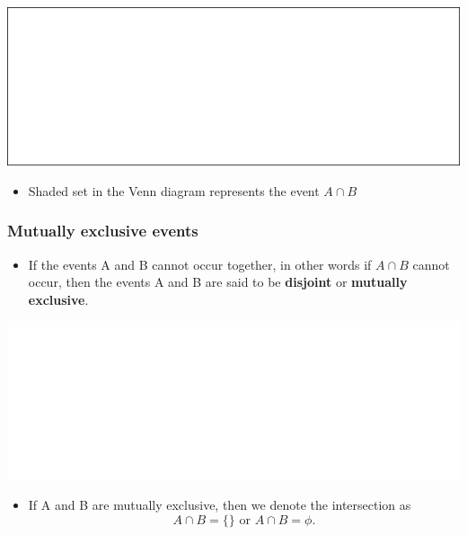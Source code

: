 \documentclass[]{book}
\providecommand{\tightlist}{%
  \setlength{\itemsep}{0pt}\setlength{\parskip}{0pt}}
\begin{document}
\begin{center}\includegraphics[width=1\linewidth]{figure/box72-1} \end{center}

\begin{itemize}
\tightlist
\item
  Shaded set in the Venn diagram represents the event \(A \cap B\)
\end{itemize}

\hypertarget{mutually-exclusive-events}{%
\subsubsection{Mutually exclusive events}\label{mutually-exclusive-events}}

\begin{itemize}
\tightlist
\item
  If the events A and B cannot occur together, in other words if \(A \cap B\) cannot occur, then the events A and B are said to be \textbf{disjoint} or \textbf{mutually exclusive}.
\end{itemize}

\begin{center}\includegraphics[width=1\linewidth]{figure/box73-1} \end{center}

\begin{itemize}
\tightlist
\item
  If A and B are mutually exclusive, then we denote the intersection as
  \[A \cap B = \{\} \text { or }  A \cap B = \phi.\]
\end{itemize}
\end{document}
